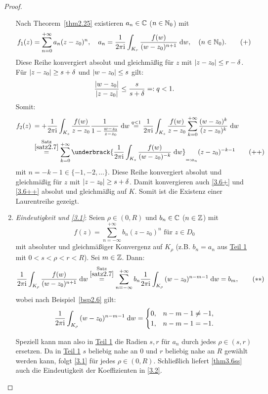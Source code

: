 \documentclass[a4paper,twoside,DIV15,BCOR12mm]{scrbook}
\begin{document}
\begin{proof}
\begin{enumerate}[label=\arabic*)]
Nach Theorem~\ref{thm2.25} existieren $a_n\in\mathbb{C}$ ($n\in\mathbb{N}_0$) mit
\[\label{3.6+}f_1(z)=\sum_{n=0}^{+\infty}a_n(z-z_0)^n,\quad a_n=\frac{1}{2\pi\mathrm{i}}\int_{K_r}^{}{\frac{f(w)}{(w-z_0)^{n+1}}}\;\mathrm{d} w,\quad(n\in\mathbb{N}_0).\tag{$+$}\]
Diese Reihe konvergiert absolut und gleichmäßig für $z$ mit $\left\lvert z-z_0\right\lvert\leq r-\delta$. Für $\left\lvert z-z_0\right\lvert\geq s+\delta$ und $\left\lvert w-z_0\right\lvert\leq s$ gilt:
\[\frac{\left\lvert w-z_0\right\lvert}{\left\lvert z-z_0\right\lvert}\leq\frac{s}{s+\delta}=: q < 1.\]
Somit:
\begin{align*}\label{3.6++}
f_2(z)\: &= +\frac{1}{2\pi\i}\integral{K_s}{}{\frac{f(w)}{z-z_0}\frac{1}{1-\frac{w-z_0}{z-z_0}}}{w} \overset{q<1}{=} \frac{1}{2\pi\i}\integral{K_s}{}{\frac{f(w)}{z-z_0}\sum_{k=0}^{+\infty}\frac{(w-z_0)^k}{(z-z_0)^k}}{w}\\
&\overset{\substack{\text{Satz}\\\ref{satz2.7}}}{=} \sum_{k=0}^{+\infty}\underbrack{\frac{1}{2\pi\i}\integral{K_s}{}{\frac{f(w)}{(w-z_0)^{-k}}}{w}}_{\ad a_n}(z-z_0)^{-k-1}\tag{$++$}
\end{align*}
mit $n=-k-1\in\{-1,-2,\dotsc\}$. Diese Reihe konvergiert absolut und gleichmäßig für $z$ mit $\left\lvert z-z_0\right\lvert\geq s+\delta$. Damit konvergieren auch \eqref{3.6+} und \eqref{3.6++} absolut und gleichmäßig auf $K$. Somit ist die Existenz einer Laurentreihe gezeigt.

\item \textit{Eindeutigkeit und \eqref{3.1}}: Seien $\rho\in(0,R)$ und $b_n\in\mathbb{C}$ ($n\in\mathbb{Z}$) mit
\[f(z)=\sum_{n=-\infty}^{+\infty}b_n(z-z_0)^n\text{ für }z\in D_0\]
mit absoluter und gleichmäßiger Konvergenz auf $K_\rho$ (z.B. $b_n=a_n$ aus \hyperref[thm3.6:1]{Teil 1} mit $0<s<\rho<r<R$). Sei $m\in\mathbb{Z}$. Dann:
\[\label{thm3.6ss}\frac{1}{2\pi\mathrm{i}}\int_{K_\rho}^{}{\frac{f(w)}{(w-z_0)^{n+1}}}\;\mathrm{d} w \overset{\substack{\text{Satz}\\\ref{satz2.7}}}{=} \sum_{n=-\infty}^{+\infty}b_n \frac{1}{2\pi\mathrm{i}}\int_{K_\rho}^{}{(w-z_0)^{n-m-1}}\;\mathrm{d} w=b_m,\tag{$**$}\]
wobei nach Beispiel~\ref{bsp2.6} gilt:
\[\frac{1}{2\pi\mathrm{i}}\int_{K_\rho}^{}{(w-z_0)^{n-m-1}}\;\mathrm{d} w=\begin{cases}0,&n-m-1\neq -1,\\1,&n-m-1=-1.\end{cases}\]

Speziell kann man also in \hyperref[thm3.6:1]{Teil 1} die Radien $s,r$ für $a_n$ durch jedes $\rho\in(s,r)$ ersetzen. Da in \hyperref[thm3.6:1]{Teil 1} $s$ beliebig nahe an 0 und $r$ beliebig nahe an $R$ gewählt werden kann, folgt \eqref{3.1} für jedes $\rho\in(0,R)$. Schließlich liefert \eqref{thm3.6ss} auch die Eindeutigkeit der Koeffizienten in \eqref{3.2}.\qedhere
\end{enumerate}
\end{proof}
\end{document}
